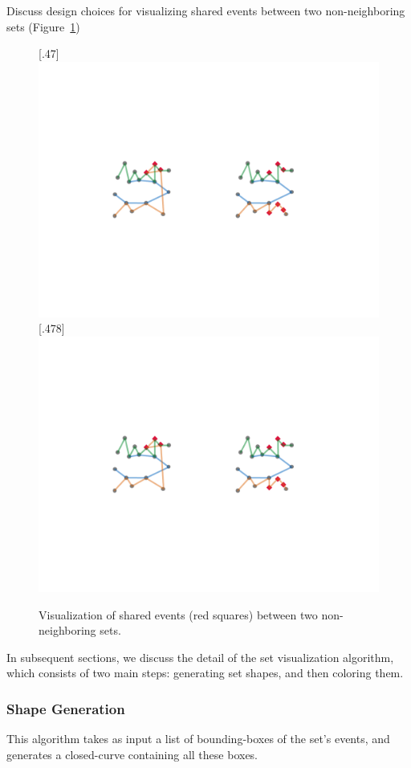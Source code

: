 Discuss design choices for visualizing shared events between two non-neighboring sets (Figure~\ref{fig:layering-compare})

\begin{figure}[!htb]
	\centering
	[.47\columnwidth]
	{\includegraphics[width=.35\columnwidth]{figure4a}}
	\hfill	
	[.478\columnwidth]
	{\includegraphics[width=.35\columnwidth]{figure4b}}
	\caption{Visualization of shared events (red squares) between two non-neighboring sets.}
	\label{fig:layering-compare}
\end{figure}

In subsequent sections, we discuss the detail of the set visualization algorithm, which consists of two main steps: generating set shapes, and then coloring them.

\subsubsection{Shape Generation}
This algorithm takes as input a list of bounding-boxes of the set's events, and generates a closed-curve containing all these boxes. 


